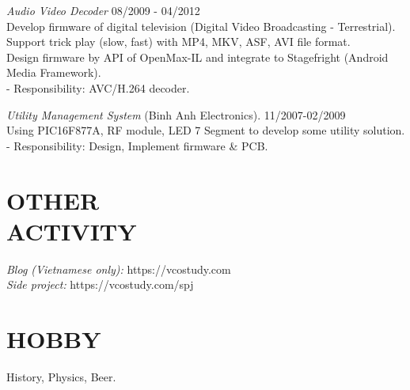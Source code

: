 \documentclass[margin]{res}
\begin{document}
\begin{resume}
                {\sl Audio Video Decoder} \hfill            08/2009 - 04/2012 \\
                 Develop firmware of digital television (Digital Video Broadcasting - Terrestrial).\\
                 Support trick play (slow, fast) with MP4, MKV, ASF, AVI file format.\\
                 Design firmware by API of OpenMax-IL and integrate to Stagefright (Android Media Framework).\\
		 - Responsibility: AVC/H.264 decoder. 


                {\sl Utility Management System} (Binh Anh Electronics). \hfill        11/2007-02/2009 \\
                Using PIC16F877A, RF module, LED 7 Segment to develop some utility solution.\\
		- Responsibility: Design, Implement firmware \& PCB.

 
\section{OTHER \\ ACTIVITY}  
		{\sl Blog (Vietnamese only):} https://vcostudy.com \\
		{\sl Side project:} https://vcostudy.com/spj

\section{HOBBY}  History, Physics, Beer.


\end{resume}
\end{document}
